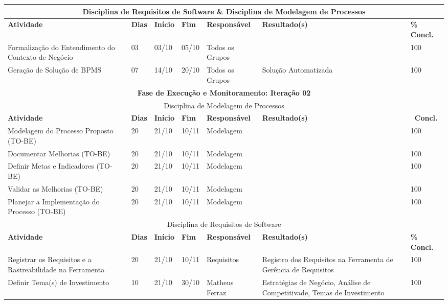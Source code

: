 \begin{center}
	\begin{tabular}{|m{6cm}|m{1cm}|m{1cm}|m{1cm}|m{4cm}|m{6cm}|m{2cm}|}
	\hline
	\multicolumn{7}{|c|}{Disciplina de Requisitos de Software \& Disciplina de Modelagem de Processos} \\ \hline
	\textbf{Atividade} & \textbf{Dias} & \textbf{Início} & \textbf{Fim} & \textbf{Responsável} & \textbf{Resultado(s)} & \textbf{\% Concl.} \\ \hline
	Formalização do Entendimento do Contexto de Negócio & 03 & 03/10 & 05/10 & Todos os Grupos & & 100 \\ \hline
	Geração de Solução de BPMS & 07 & 14/10 & 20/10 & Todos os Grupos & Solução Automatizada & 100 \\ \hline
	\multicolumn{7}{|c|}{\textbf{Fase de Execução e Monitoramento: Iteração 02}} \\
	\hline
	\multicolumn{7}{|c|}{Disciplina de Modelagem de Processos} \\
	\hline
	\textbf{Atividade} & \textbf{Dias} & \textbf{Início} & \textbf{Fim} & \textbf{Responsável} & \textbf{Resultado(s)} & \textbf{\ Concl.} \\ \hline
	Modelagem do Processo Proposto (TO-BE) & 20 & 21/10 & 10/11 & Modelagem & & 100 \\ \hline
	Documentar Melhorias (TO-BE) & 20 & 21/10 & 10/11 & Modelagem & & 100 \\ \hline
	Definir Metas e Indicadores (TO-BE) & 20 & 21/10 & 10/11 & Modelagem & & 100 \\ \hline
	Validar as Melhorias (TO-BE) & 20 & 21/10 & 10/11 & Modelagem & & 100 \\ \hline
	Planejar a Implementação do Processo (TO-BE) & 20 & 21/10 & 10/11 & Modelagem & & 100 \\ \hline
	\multicolumn{7}{|c|}{Disciplina de Requisitos de Software} \\
	\hline
	\textbf{Atividade} & \textbf{Dias} & \textbf{Início} & \textbf{Fim} & \textbf{Responsável} & \textbf{Resultado(s)} & \textbf{\% Concl.} \\ \hline
	Registrar os Requisitos e a Rastreabilidade na Ferramenta & 20 & 21/10 & 10/11 & Requisitos & Registro dos Requisitos na Ferramenta de Gerência de Requisitos & 100 \\ \hline
	Definir Tema(s) de Investimento & 10 & 21/10 & 30/10 & Matheus Ferraz & Estratégias de Negócio, Análise de Competitivade, Temas de Investimento & 100 \\ \hline
	\end{tabular}
\end{center}
